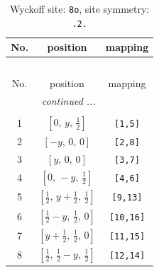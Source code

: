 \documentclass[fleqn,8pt]{jsarticle}
\begin{document}
\begin{longtable}{ccc}
\caption{Wyckoff site: {\tt 8o}, site symmetry: {\tt .2.}}
 \\
 \hline \hline
No. & position & mapping \\ \hline \endfirsthead

\multicolumn{2}{l}{\tablename\ \thetable{}} \\
 \hline \hline
No. & position & mapping \\ \hline \endhead

 \hline \hline
\multicolumn{2}{r}{\footnotesize\it continued ...} \\ \endfoot

 \hline \hline
\multicolumn{2}{r}{} \\ \endlastfoot

1 & $\left[ 0,\, y,\, \frac{1}{2} \right]$ & {\tt [1,5]} \\ \hline
2 & $\left[ - y,\, 0,\, 0 \right]$ & {\tt [2,8]} \\ \hline
3 & $\left[ y,\, 0,\, 0 \right]$ & {\tt [3,7]} \\ \hline
4 & $\left[ 0,\, - y,\, \frac{1}{2} \right]$ & {\tt [4,6]} \\ \hline
5 & $\left[ \frac{1}{2},\, y + \frac{1}{2},\, \frac{1}{2} \right]$ & {\tt [9,13]} \\ \hline
6 & $\left[ \frac{1}{2} - y,\, \frac{1}{2},\, 0 \right]$ & {\tt [10,16]} \\ \hline
7 & $\left[ y + \frac{1}{2},\, \frac{1}{2},\, 0 \right]$ & {\tt [11,15]} \\ \hline
8 & $\left[ \frac{1}{2},\, \frac{1}{2} - y,\, \frac{1}{2} \right]$ & {\tt [12,14]} \\
\end{longtable}
\renewcommand{\arraystretch}{1.2}
\end{document}
